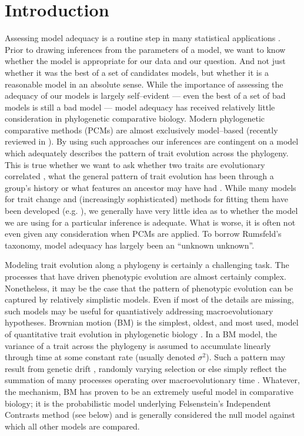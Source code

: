 \documentclass[a4paper,12pt]{article}
\begin{document}
\section{Introduction}

Assessing model adequacy is a routine step in many statistical applications \citep{Gelmanbook}. Prior to drawing inferences from the parameters of a model, we want to know whether the model is appropriate for our data and our question. And not just whether it was the best of a set of candidates models, but whether it is a reasonable model in an absolute sense. While the importance of assessing the adequacy of our models is largely self--evident --- even the best of a set of bad models is still a bad model --- model adequacy has received relatively little consideration in phylogenetic comparative biology. Modern phylogenetic comparative methods (PCMs) are almost exclusively model--based (recently reviewed in \citep{Omeara2012, PennellHarmon}). By using such approaches our inferences are contingent on a model which adequately describes the pattern of trait evolution across the phylogeny. This is true whether we want to ask whether two traits are evolutionary correlated \citep{Felsenstein1985, Grafen1989, HarveyPagel1991}, what the general pattern of trait evolution has been through a group's history \citep{Mooers1999, Harmon2010, Hunt2012} or what features an ancestor may have had \citep{Schluter1997}. While many models for trait change and (increasingly sophisticated) methods for fitting them have been developed (e.g. \citep{Felsenstein1985, Hansen1997, Pagel1999, ButlerKing2004, Omeara2006, Eastman2011, Beaulieu2012}), we generally have very little idea as to whether the model we are using for a particular inference is adequate. What is worse, it is often not even given any consideration when PCMs are applied. To borrow Rumsfeld's taxonomy, model adequacy has largely been an ``unknown unknown''.

Modeling trait evolution along a phylogeny is certainly a challenging task. The processes that have driven phenotypic evolution are almost certainly complex. Nonetheless, it may be the case that the pattern of phenotypic evolution can be captured by relatively simplistic models. Even if most of the details are missing, such models may be useful for quantiatively addressing macroevolutionary hypotheses. Brownian motion (BM) is the simplest, oldest, and most used, model of quantitative trait evolution in phylogenetic biology  \citep{Edwards1964, Felsenstein1973, Thompson1975}. In a BM model, the variance of a trait across the phylogeny is assumed to accumulate linearly through time at some constant rate (usually denoted $\sigma^2$). Such a pattern may result from genetic drift \citep{Lande1977, Felsenstein1988, Lynch1990, HansenMartins1996}, randomly varying selection \citep{Felsenstein1973, Felsenstein1988} or else simply reflect the summation of many processes operating over macroevolutionary time \citep{HansenMartins1996, Uyeda2011, PennellPE}. Whatever, the mechanism, BM has proven to be an extremely useful model in comparative biology; it is the probabilistic model underlying Felsenstein's Independent Contrasts method \citep{Felsenstein1985} (see below) and is generally considered the null model against which all other models are compared.
 
\end{document}
